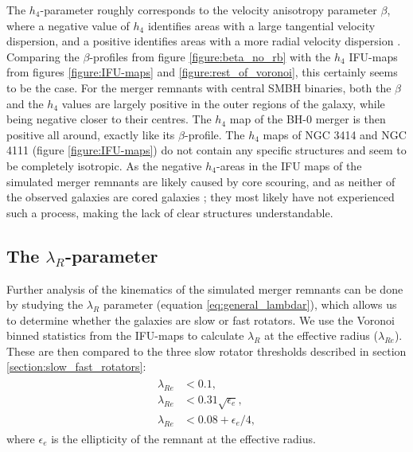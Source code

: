 \documentclass[english, twoside]{HYgradu}
\begin{document}
The $h_4$-parameter roughly corresponds to the velocity anisotropy parameter $\beta$, where a negative value of $h_4$ identifies areas with a large tangential velocity dispersion, and a positive identifies areas with a more radial velocity dispersion \citep{Gerhard1993, Gerhard1998, Thomas2007}. Comparing the $\beta$-profiles from figure \ref{figure:beta_no_rb} with the $h_4$ IFU-maps from figures \ref{figure:IFU-maps} and \ref{figure:rest_of_voronoi}, this certainly seems to be the case. For the merger remnants with central SMBH binaries, both the $\beta$ and the $h_4$ values are largely positive in the outer regions of the galaxy, while being negative closer to their centres. The $h_4$ map of the BH-0 merger is then positive all around, exactly like its $\beta$-profile. The $h_4$ maps of NGC 3414 and NGC 4111 (figure \ref{figure:IFU-maps}) do not contain any specific structures and seem to be completely isotropic. As the negative $h_4$-areas in the IFU maps of the simulated merger remnants are likely caused by core scouring, and as neither of the observed galaxies are cored galaxies \citep{Lauer2007}; they most likely have not experienced such a process, making the lack of clear structures understandable.

\subsection{The $\lambda_R$-parameter}

Further analysis of the kinematics of the simulated merger remnants can be done by studying the $\lambda_R$ parameter (equation \ref{eq:general_lambdar}), which allows us to determine whether the galaxies are slow or fast rotators. We use the Voronoi binned statistics from the IFU-maps to calculate $\lambda_R$ at the effective radius ($\lambda_{Re}$). These are then compared to the three slow rotator thresholds described in section \ref{section:slow_fast_rotators}:
 \begin{align}
\begin{split}
\lambda_{Re} &< 0.1, \\
\lambda_{Re} &< 0.31\sqrt{\epsilon_e},\\
\lambda_{Re} &< 0.08 + \epsilon_e/4,
\end{split}
\end{align}
where $\epsilon_e$ is the ellipticity of the remnant at the effective radius.
\end{document}
